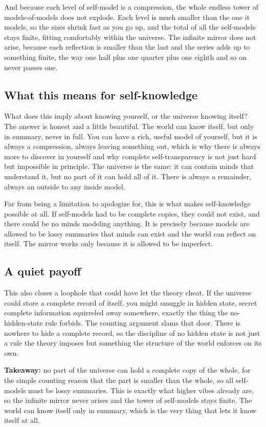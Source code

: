 And because each level of self-model is a compression, the whole endless tower of models-of-models does not explode. Each level is much smaller than the one it models, so the sizes shrink fast as you go up, and the total of all the self-models stays finite, fitting comfortably within the universe. The infinite mirror does not arise, because each reflection is smaller than the last and the series adds up to something finite, the way one half plus one quarter plus one eighth and so on never passes one.

\subsection{What this means for self-knowledge}

What does this imply about knowing yourself, or the universe knowing itself? The answer is honest and a little beautiful. The world can know itself, but only in summary, never in full. You can have a rich, useful model of yourself, but it is always a compression, always leaving something out, which is why there is always more to discover in yourself and why complete self-transparency is not just hard but impossible in principle. The universe is the same: it can contain minds that understand it, but no part of it can hold all of it. There is always a remainder, always an outside to any inside model.

Far from being a limitation to apologize for, this is what makes self-knowledge possible at all. If self-models had to be complete copies, they could not exist, and there could be no minds modeling anything. It is precisely because models are allowed to be lossy summaries that minds can exist and the world can reflect on itself. The mirror works only because it is allowed to be imperfect.

\subsection{A quiet payoff}

This also closes a loophole that could have let the theory cheat. If the universe could store a complete record of itself, you might smuggle in hidden state, secret complete information squirreled away somewhere, exactly the thing the no-hidden-state rule forbids. The counting argument slams that door. There is nowhere to hide a complete record, so the discipline of no hidden state is not just a rule the theory imposes but something the structure of the world enforces on its own.

\textbf{Takeaway:} no part of the universe can hold a complete copy of the whole, for the simple counting reason that the part is smaller than the whole, so all self-models must be lossy summaries. This is exactly what higher vibes already are, so the infinite mirror never arises and the tower of self-models stays finite. The world can know itself only in summary, which is the very thing that lets it know itself at all.
